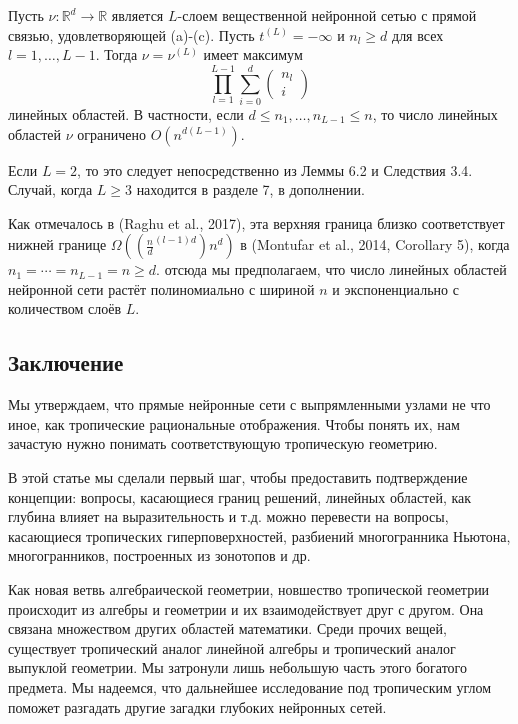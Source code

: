 \documentclass[russian]{lecture-notes}
\begin{document}
		\begin{Theorem}
			Пусть $\nu : \mathbb{R}^d \rightarrow \mathbb{R}$ является $L$-слоем вещественной нейронной сетью с прямой связью, удовлетворяющей (a)-(c). Пусть $t^{(L)} = -\infty$ и $n_l \geq d$ для всех $l = 1,\dots,L-1$. Тогда $\nu = \nu^{(L)}$ имеет максимум
			\[
				\prod\limits_{l=1}^{L-1}\sum\limits_{i = 0}^{d} \begin{pmatrix}
				n_l\\
				i
				\end{pmatrix}
			\]
			линейных областей. В частности, если $d\leq n_1,\dots ,n_{L-1} \leq n$, то число линейных областей $\nu$ ограничено $O(n^{d(L-1)})$.
		\end{Theorem}
		
		\begin{Proof}
			Если $L = 2$, то это следует непосредственно из Леммы 6.2 и Следствия 3.4. Случай, когда $L \geq 3$ находится в разделе 7, в дополнении.
		\end{Proof}
	
	Как отмечалось в (Raghu et al., 2017), эта верхняя граница близко соответствует нижней границе $\Omega ((\frac{n}{d}^{(l-1)d})  n^d)$ в (Montufar et al., 2014, Corollary 5), когда $n_1 = \cdots = n_{L-1} = n \geq d$. отсюда мы предполагаем, что число линейных областей нейронной сети растёт полиномиально с шириной $n$ и экспоненциально с количеством слоёв $L$.
	
	\subsection{Заключение}
	
	Мы утверждаем, что прямые нейронные сети с выпрямленными узлами не что иное, как тропические рациональные отображения. Чтобы понять их, нам зачастую нужно понимать соответствующую тропическую геометрию.
	
	В этой статье мы сделали первый шаг, чтобы предоставить подтверждение концепции: вопросы, касающиеся границ решений, линейных областей, как глубина влияет на выразительность и т.д. можно перевести на вопросы, касающиеся тропических гиперповерхностей, разбиений многогранника Ньютона, многогранников, построенных из зонотопов и др.
	
	Как новая ветвь алгебраической геометрии, новшество тропической геометрии происходит из алгебры и геометрии и их взаимодействует друг с другом. Она связана множеством других областей математики. Среди прочих вещей, существует тропический аналог линейной алгебры и тропический аналог выпуклой геометрии. Мы затронули лишь небольшую часть этого богатого предмета. Мы надеемся, что дальнейшее исследование под тропическим углом поможет разгадать другие загадки глубоких нейронных сетей.
\end{document}
